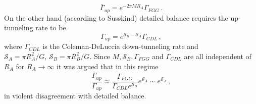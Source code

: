 \documentclass[a4paper,11pt]{article}
\numberwithin{equation}{section}
\def\S{\mathcal S}
\numberwithin{equation}{section}
\begin{document}
\begin{equation}
\bar{\Gamma}_{up}=e^{-2\pi MR_{A}}\Gamma_{FGG} \,.\label{eq:Gammabar}
\end{equation}
On the other hand (according to Susskind) detailed balance requires
the up-tunneling rate to be 
\begin{equation}
\Gamma_{up}=e^{\S_{B}-\S_{A}}\Gamma_{CDL} \,,\label{eq:upCDL}
\end{equation}
where $\Gamma_{CDL}$ is the Coleman-DeLuccia down-tunneling rate
and $\S_{A}=\pi R_{A}^{2}/G,\,\S_{B}=\pi R_{B}^{2}/G$. Since $M,\S_{B},\Gamma_{FGG}$
and $\Gamma_{CDL}$ are all independent of $R_{A}$ for $R_{A}\rightarrow\infty$
it was argued that in this regime
\begin{equation}
\frac{\bar{\Gamma}_{up}}{\Gamma_{up}}\approx\frac{\Gamma_{FGG}}{\Gamma_{CDL}e^{\S_{B}}}e^{\S_{A}}\sim e^{\S_{A}} \,,\label{eq:Susskind}
\end{equation}
in violent disagreement with detailed balance.
\end{document}

